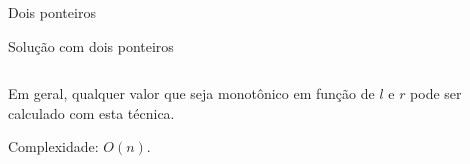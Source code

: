 \begin{frame}{Dois ponteiros}
    
    \begin{block}{Solução com dois ponteiros}
        \footnotesize
        \inputminted{cpp}{codigos/twopointers.cpp}    
    \end{block} \pause

    Em geral, qualquer valor que seja monotônico em função de $l$ e $r$ pode ser calculado com esta técnica. \pause

    Complexidade: $O(n)$.
    
\end{frame}

